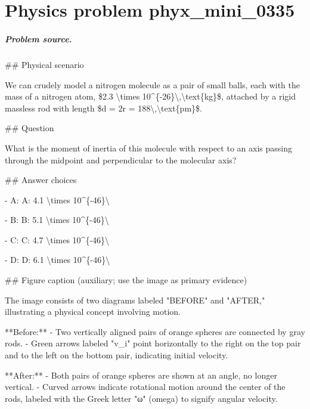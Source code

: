 
\chapter{Physics problem phyx\_mini\_0335}
\label{ch:PhyXMiniProblems_problem_phyx_mini_0335}

\paragraph{Problem source.}
\#\# Physical scenario

We can crudely model a nitrogen molecule as a pair of small balls, each with the mass of a nitrogen atom, \$2.3 \textbackslash{}times 10\textasciicircum{}\{-26\}\textbackslash{},\textbackslash{}text\{kg\}\$, attached by a rigid massless rod with length \$d = 2r = 188\textbackslash{},\textbackslash{}text\{pm\}\$.

\#\# Question

What is the moment of inertia of this molecule with respect to an axis passing through the midpoint and perpendicular to the molecular axis?

\#\# Answer choices

- A: A: 4.1 \textbackslash{}times 10\textasciicircum{}\{-46\}\textbackslash{}

- B: B: 5.1 \textbackslash{}times 10\textasciicircum{}\{-46\}\textbackslash{}

- C: C: 4.7 \textbackslash{}times 10\textasciicircum{}\{-46\}\textbackslash{}

- D: D: 6.1 \textbackslash{}times 10\textasciicircum{}\{-46\}\textbackslash{}

\#\# Figure caption (auxiliary; use the image as primary evidence)

The image consists of two diagrams labeled "BEFORE" and "AFTER," illustrating a physical concept involving motion.

**Before:**
- Two vertically aligned pairs of orange spheres are connected by gray rods.
- Green arrows labeled "v\_i" point horizontally to the right on the top pair and to the left on the bottom pair, indicating initial velocity.

**After:**
- Both pairs of orange spheres are shown at an angle, no longer vertical.
- Curved arrows indicate rotational motion around the center of the rods, labeled with the Greek letter "ω" (omega) to signify angular velocity.

